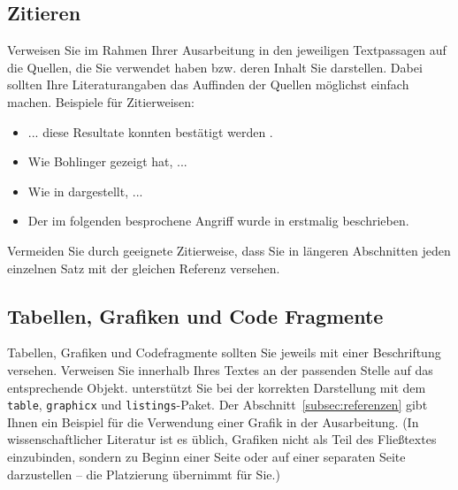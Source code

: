 \documentclass[lang=english]{secseminar}
\begin{document}
\subsection{Zitieren}
Verweisen Sie im Rahmen Ihrer Ausarbeitung in den jeweiligen Textpassagen auf die Quellen, die Sie
verwendet haben bzw. deren Inhalt Sie darstellen.  Dabei sollten Ihre Literaturangaben das Auffinden
der Quellen möglichst einfach machen.  Beispiele für Zitierweisen:
\begin{itemize}
\item ... diese Resultate konnten bestätigt werden \cite{stickel2009wissenschaftliches}.
\item Wie Bohlinger \cite{BOH07} gezeigt hat, ...
\item Wie in \cite{KAR} dargestellt, ...
\item Der im folgenden besprochene Angriff wurde in \cite{DBLP:conf/ccs/AdrianBDGGHHSTV15} erstmalig
  beschrieben.
\end{itemize}
Vermeiden Sie durch geeignete Zitierweise, dass Sie in längeren Abschnitten jeden einzelnen Satz mit
der gleichen Referenz versehen.

\subsection{Tabellen, Grafiken und Code Fragmente}
Tabellen, Grafiken und Codefragmente sollten Sie jeweils mit einer Beschriftung versehen. Verweisen
Sie innerhalb Ihres Textes an der passenden Stelle auf das entsprechende Objekt. 
unterstützt Sie bei der korrekten Darstellung mit dem \texttt{table}, \texttt{graphicx} und
\texttt{listings}-Paket. Der Abschnitt~\ref{subsec:referenzen} gibt Ihnen ein Beispiel für die
Verwendung einer Grafik in der Ausarbeitung. (In wissenschaftlicher Literatur ist es üblich,
Grafiken nicht als Teil des Fließtextes einzubinden, sondern zu Beginn einer Seite oder auf einer
separaten Seite darzustellen -- die Platzierung übernimmt  für Sie.)
\end{document}
